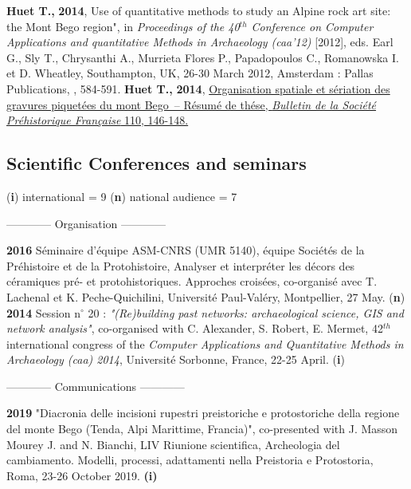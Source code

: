 \documentclass[11pt]{report} %
\begin{document}
\smallbreak
\textbf{Huet T.,} \textbf{2014}, Use of quantitative methods to study an Alpine rock art site: the Mont Bego region", in \textit{Proceedings of the 40${}^{th}$ Conference on Computer Applications and quantitative Methods in Archaeology (caa'12) }[2012], eds. Earl G., Sly T., Chrysanthi A., Murrieta Flores P., Papadopoulos C., Romanowska I. et D. Wheatley, Southampton, UK, 26-30 March 2012, Amsterdam : Pallas Publications, , 584-591.
\smallbreak
\textbf{Huet T.,} \textbf{2014}, \href{https://www.persee.fr/doc/bspf_0249-7638_2013_num_110_1_14242}{Organisation spatiale et s\'{e}riation des gravures piquet\'{e}es du mont Bego~-- R\'{e}sum\'{e} de th\'{e}se, \textit{Bulletin de la Soci\'{e}t\'{e} Pr\'{e}historique Fran\c{c}aise} 110, 146-148.}

\subsection*{Scientific Conferences and seminars }
\begin{center}(\textbf{i}) international = 9 {\textbar} (\textbf{n}) national audience = 7 \end{center}
\smallbreak
\begin{center}------------ Organisation ------------\end{center}
\smallbreak
\textbf{2016 }S\'{e}minaire d'\'{e}quipe ASM-CNRS (UMR 5140), \'{e}quipe Soci\'{e}t\'{e}s de la Pr\'{e}histoire et de la Protohistoire, Analyser et interpr\'{e}ter les d\'{e}cors des c\'{e}ramiques pr\'{e}- et protohistoriques. Approches crois\'{e}es, co-organis\'{e} avec T. Lachenal et K. Peche-Quichilini, Universit\'{e} Paul-Val\'{e}ry, Montpellier, 27 May. (\textbf{n})
\smallbreak
\textbf{2014 }Session n$\mathrm{{}^\circ}$ 20 :\textit{ "(Re)building past networks: archaeological science, GIS and network analysis"}, co-organised with C. Alexander, S. Robert, E. Mermet, 42${}^{th}$ international congress of the \textit{Computer Applications and Quantitative Methods in Archaeology (caa) 2014}, Universit\'{e} Sorbonne, France, 22-25 April. (\textbf{i})
\bigbreak
\begin{center}------------ Communications ------------\end{center}
\smallbreak
\textbf{2019 }"Diacronia delle incisioni rupestri preistoriche e protostoriche della regione del monte Bego (Tenda, Alpi Marittime, Francia)", co-presented with J. Masson Mourey J. and N. Bianchi, LIV Riunione scientifica, Archeologia del cambiamento. Modelli, processi, adattamenti nella Preistoria e Protostoria, Roma, 23-26 October 2019. \textbf{(i)}
\end{document}
